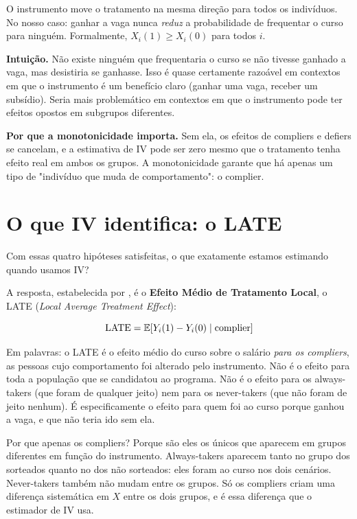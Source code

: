 \begin{hipotesebox}
O instrumento move o tratamento na mesma direção para todos os indivíduos. No nosso caso: ganhar a vaga nunca \textit{reduz} a probabilidade de frequentar o curso para ninguém. Formalmente, $X_i(1) \geq X_i(0)$ para todos $i$.

\textbf{Intuição.} Não existe ninguém que frequentaria o curso se não tivesse ganhado a vaga, mas desistiria se ganhasse. Isso é quase certamente razoável em contextos em que o instrumento é um benefício claro (ganhar uma vaga, receber um subsídio). Seria mais problemático em contextos em que o instrumento pode ter efeitos opostos em subgrupos diferentes.

\textbf{Por que a monotonicidade importa.} Sem ela, os efeitos de compliers e defiers se cancelam, e a estimativa de IV pode ser zero mesmo que o tratamento tenha efeito real em ambos os grupos. A monotonicidade garante que há apenas um tipo de "indivíduo que muda de comportamento": o complier.
\end{hipotesebox}

\section{O que IV identifica: o LATE}
\label{sec:late}

Com essas quatro hipóteses satisfeitas, o que exatamente estamos estimando quando usamos IV?

A resposta, estabelecida por \citet{ImbensAngrist1994}, é o \textbf{Efeito Médio de Tratamento Local}, o LATE (\textit{Local Average Treatment Effect}):

\begin{equation}
\text{LATE} = \mathbb{E}[Y_i(1) - Y_i(0) \mid \text{complier}]
\label{eq:late}
\end{equation}

Em palavras: o LATE é o efeito médio do curso sobre o salário \textit{para os compliers}, as pessoas cujo comportamento foi alterado pelo instrumento. Não é o efeito para toda a população que se candidatou ao programa. Não é o efeito para os always-takers (que foram de qualquer jeito) nem para os never-takers (que não foram de jeito nenhum). É especificamente o efeito para quem foi ao curso porque ganhou a vaga, e que não teria ido sem ela.

Por que apenas os compliers? Porque são eles os únicos que aparecem em grupos diferentes em função do instrumento. Always-takers aparecem tanto no grupo dos sorteados quanto no dos não sorteados: eles foram ao curso nos dois cenários. Never-takers também não mudam entre os grupos. Só os compliers criam uma diferença sistemática em $X$ entre os dois grupos, e é essa diferença que o estimador de IV usa.

